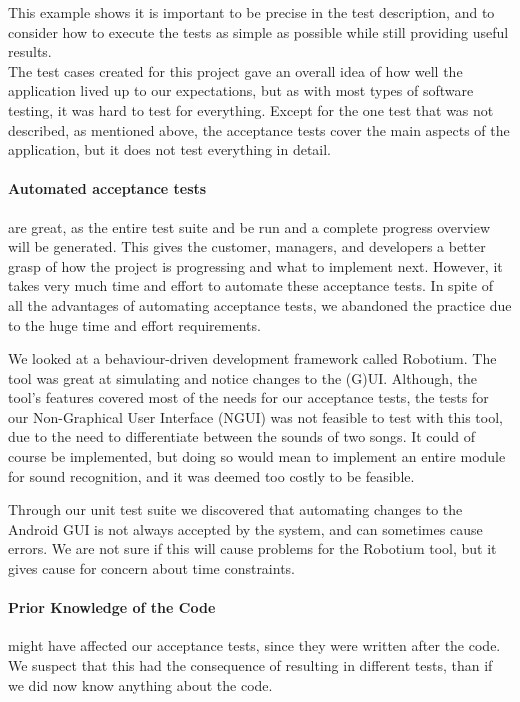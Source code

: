 This example shows it is important to be precise in the test description, and to consider how to execute the tests as simple as possible while still providing useful results.\\

The test cases created for this project gave an overall idea of how well the application lived up to our expectations, but as with most types of software testing, it was hard to test for everything.
Except for the one test that was not described, as mentioned above, the acceptance tests cover the main aspects of the application, but it does not test everything in detail. 

\paragraph{Automated acceptance tests} are great, as the entire test suite and be run and a complete progress overview will be generated.
This gives the customer, managers, and developers a better grasp of how the project is progressing and what to implement next.
However, it takes very much time and effort to automate these acceptance tests.
In spite of all the advantages of automating acceptance tests, we abandoned the practice due to the huge time and effort requirements.

We looked at a behaviour-driven development framework called Robotium.
The tool was great at simulating and notice changes to the (G)UI.
Although, the tool's features covered most of the needs for our acceptance tests, the tests for our Non-Graphical User Interface (NGUI) was not feasible to test with this tool, due to the need to differentiate between the sounds of two songs.
It could of course be implemented, but doing so would mean to implement an entire module for sound recognition, and it was deemed too costly to be feasible. 

Through our unit test suite we discovered that automating changes to the Android GUI is not always accepted by the system, and can sometimes cause errors.
We are not sure if this will cause problems for the Robotium tool, but it gives cause for concern about time constraints.

\paragraph{Prior Knowledge of the Code} might have affected our acceptance tests, since they were written after the code. We suspect that this had the consequence of resulting in different tests, than if we did now know anything about the code. 

